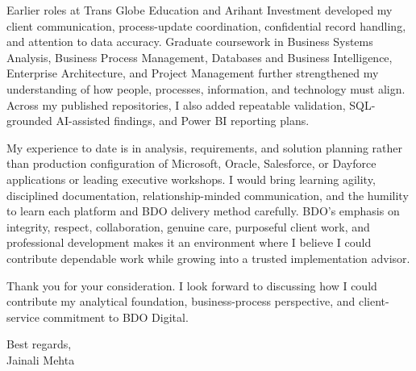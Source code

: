 \documentclass[letterpaper,11pt]{article}
\begin{document}
\bigbreak
Earlier roles at Trans Globe Education and Arihant Investment developed my client communication, process-update coordination, confidential record handling, and attention to data accuracy. Graduate coursework in Business Systems Analysis, Business Process Management, Databases and Business Intelligence, Enterprise Architecture, and Project Management further strengthened my understanding of how people, processes, information, and technology must align. Across my published repositories, I also added repeatable validation, SQL-grounded AI-assisted findings, and Power BI reporting plans.

\bigbreak
My experience to date is in analysis, requirements, and solution planning rather than production configuration of Microsoft, Oracle, Salesforce, or Dayforce applications or leading executive workshops. I would bring learning agility, disciplined documentation, relationship-minded communication, and the humility to learn each platform and BDO delivery method carefully. BDO's emphasis on integrity, respect, collaboration, genuine care, purposeful client work, and professional development makes it an environment where I believe I could contribute dependable work while growing into a trusted implementation advisor.

\bigbreak
Thank you for your consideration. I look forward to discussing how I could contribute my analytical foundation, business-process perspective, and client-service commitment to BDO Digital.

\bigbreak
Best regards,\\
Jainali Mehta
\end{document}
